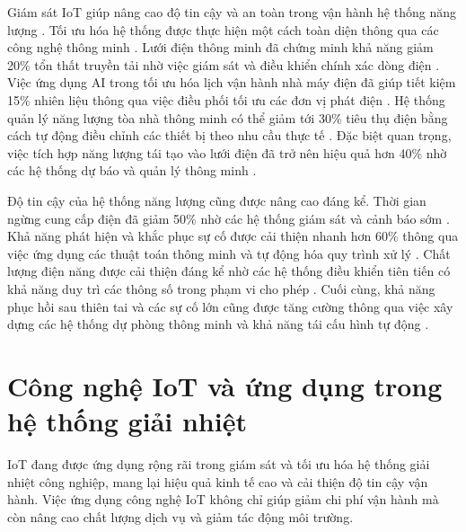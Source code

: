 \documentclass[../main.tex]{subfiles}
\begin{document}
Giám sát IoT giúp nâng cao độ tin cậy và an toàn trong vận hành hệ thống năng lượng \cite{zhang2022iot, mckinsey2019iot}. Tối ưu hóa hệ thống được thực hiện một cách toàn diện thông qua các công nghệ thông minh \cite{zhang2022iot}. Lưới điện thông minh đã chứng minh khả năng giảm 20\% tổn thất truyền tải nhờ việc giám sát và điều khiển chính xác dòng điện \cite{iea2022smartgrid}. Việc ứng dụng AI trong tối ưu hóa lịch vận hành nhà máy điện đã giúp tiết kiệm 15\% nhiên liệu thông qua việc điều phối tối ưu các đơn vị phát điện \cite{li2023ai, mckinsey2019iot}. Hệ thống quản lý năng lượng tòa nhà thông minh có thể giảm tới 30\% tiêu thụ điện bằng cách tự động điều chỉnh các thiết bị theo nhu cầu thực tế \cite{statista2023smartbuilding, iea2022building}. Đặc biệt quan trọng, việc tích hợp năng lượng tái tạo vào lưới điện đã trở nên hiệu quả hơn 40\% nhờ các hệ thống dự báo và quản lý thông minh \cite{zhang2022distributed, irena2023decentralized}.

Độ tin cậy của hệ thống năng lượng cũng được nâng cao đáng kể. Thời gian ngừng cung cấp điện đã giảm 50\% nhờ các hệ thống giám sát và cảnh báo sớm \cite{zhang2022iot, mckinsey2019iot}. Khả năng phát hiện và khắc phục sự cố được cải thiện nhanh hơn 60\% thông qua việc ứng dụng các thuật toán thông minh và tự động hóa quy trình xử lý \cite{li2023ai, iea2022smartgrid}. Chất lượng điện năng được cải thiện đáng kể nhờ các hệ thống điều khiển tiên tiến có khả năng duy trì các thông số trong phạm vi cho phép \cite{ashrae2020powerquality}. Cuối cùng, khả năng phục hồi sau thiên tai và các sự cố lớn cũng được tăng cường thông qua việc xây dựng các hệ thống dự phòng thông minh và khả năng tái cấu hình tự động \cite{iea2023digitalization, zhao2023digital}.

\section{Công nghệ IoT và ứng dụng trong hệ thống giải nhiệt}
\label{sec:iot_technology_cooling_applications}

IoT đang được ứng dụng rộng rãi trong giám sát và tối ưu hóa hệ thống giải nhiệt công nghiệp, mang lại hiệu quả kinh tế cao và cải thiện độ tin cậy vận hành. Việc ứng dụng công nghệ IoT không chỉ giúp giảm chi phí vận hành mà còn nâng cao chất lượng dịch vụ và giảm tác động môi trường.
\end{document}
